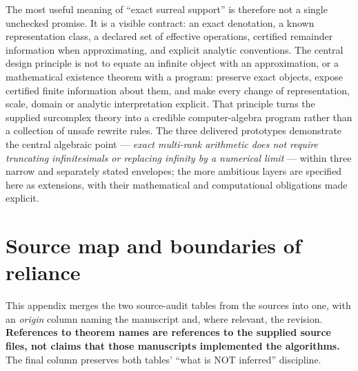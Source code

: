 \documentclass[11pt,letterpaper]{article}
\numberwithin{equation}{section}
\theoremstyle{definition}
\theoremstyle{remark}
\begin{document}
The most useful meaning of ``exact surreal support'' is therefore not a single
unchecked promise. It is a visible contract: an exact denotation, a known
representation class, a declared set of effective operations, certified
remainder information when approximating, and explicit analytic conventions. The
central design principle is not to equate an infinite object with an
approximation, or a mathematical existence theorem with a program: preserve
exact objects, expose certified finite information about them, and make every
change of representation, scale, domain or analytic interpretation explicit.
That principle turns the supplied surcomplex theory into a credible
computer-algebra program rather than a collection of unsafe rewrite rules. The
three delivered prototypes demonstrate the central algebraic point ---
\emph{exact multi-rank arithmetic does not require truncating infinitesimals or
replacing infinity by a numerical limit} --- within three narrow and
separately stated envelopes; the more ambitious layers are specified here as
extensions, with their mathematical and computational obligations made explicit.

\appendix

\section{Source map and boundaries of reliance}
\label{cas:app-audit}

This appendix merges the two source-audit tables from the sources into one, with
an \emph{origin} column naming the manuscript and, where relevant, the revision.
\textbf{References to theorem names are references to the supplied source files,
not claims that those manuscripts implemented the algorithms.} The final column
preserves both tables' ``what is NOT inferred'' discipline.
\end{document}
